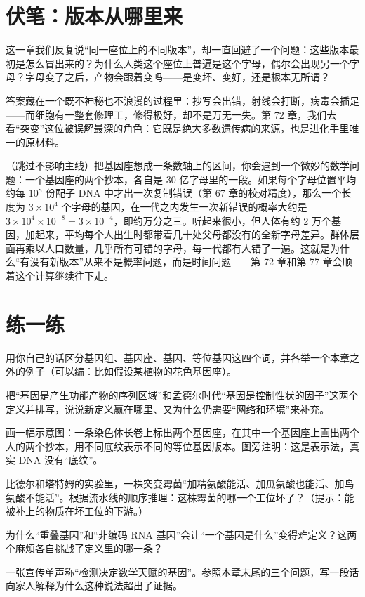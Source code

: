 \section{伏笔：版本从哪里来}

这一章我们反复说“同一座位上的不同版本”，却一直回避了一个问题：这些版本最初是怎么冒出来的？为什么人类这个座位上普遍是这个字母，偶尔会出现另一个字母？字母变了之后，产物会跟着变吗——是变坏、变好，还是根本无所谓？

答案藏在一个既不神秘也不浪漫的过程里：抄写会出错，射线会打断，病毒会插足——而细胞有一整套修理工，修得极好，却不是万无一失。第 72 章，我们去看“突变”这位被误解最深的角色：它既是绝大多数遗传病的来源，也是进化手里唯一的原材料。

\begin{tiaozhan}
（跳过不影响主线）把基因座想成一条数轴上的区间，你会遇到一个微妙的数学问题：一个基因座的两个抄本，各自是 30 亿字母里的一段。如果每个字母位置平均约每 $10^{8}$ 份配子 DNA 中才出一次复制错误（第 67 章的校对精度），那么一个长度为 $3\times 10^{4}$ 个字母的基因，在一代之内发生一次新错误的概率大约是 $3\times 10^{4}\times 10^{-8}=3\times 10^{-4}$，即约万分之三。听起来很小，但人体有约 2 万个基因，加起来，平均每个人出生时都带着几十处父母都没有的全新字母差异。群体层面再乘以人口数量，几乎所有可错的字母，每一代都有人错了一遍。这就是为什么“有没有新版本”从来不是概率问题，而是时间问题——第 72 章和第 77 章会顺着这个计算继续往下走。
\end{tiaozhan}

\section*{练一练}

\begin{sikaoti}
\item 用你自己的话区分基因组、基因座、基因、等位基因这四个词，并各举一个本章之外的例子（可以编：比如假设某植物的花色基因座）。
\item 把“基因是产生功能产物的序列区域”和孟德尔时代“基因是控制性状的因子”这两个定义并排写，说说新定义赢在哪里、又为什么仍需要“网络和环境”来补充。
\item 画一幅示意图：一条染色体长卷上标出两个基因座，在其中一个基因座上画出两个人的两个抄本，用不同底纹表示不同的等位基因版本。图旁注明：这是表示法，真实 DNA 没有“底纹”。
\item 比德尔和塔特姆的实验里，一株突变霉菌“加精氨酸能活、加瓜氨酸也能活、加鸟氨酸不能活”。根据流水线的顺序推理：这株霉菌的哪一个工位坏了？（提示：能被补上的物质在坏工位的下游。）
\item 为什么“重叠基因”和“非编码 RNA 基因”会让“一个基因是什么”变得难定义？这两个麻烦各自挑战了定义里的哪一条？
\item 一张宣传单声称“检测决定数学天赋的基因”。参照本章末尾的三个问题，写一段话向家人解释为什么这种说法超出了证据。
\end{sikaoti}
